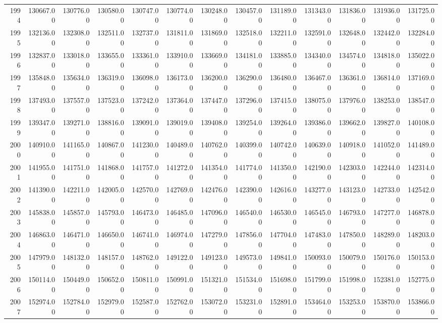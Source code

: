 \begin{longtable}{rrrrrrrrrrrrr}
  1994 & 130667.00 & 130776.00 & 130580.00 & 130747.00 & 130774.00 & 130248.00 & 130457.00 & 131189.00 & 131343.00 & 131836.00 & 131936.00 & 131725.00 \\ 
  1995 & 132136.00 & 132308.00 & 132511.00 & 132737.00 & 131811.00 & 131869.00 & 132518.00 & 132211.00 & 132591.00 & 132648.00 & 132442.00 & 132284.00 \\ 
  1996 & 132837.00 & 133018.00 & 133655.00 & 133361.00 & 133910.00 & 133669.00 & 134181.00 & 133885.00 & 134340.00 & 134574.00 & 134818.00 & 135022.00 \\ 
  1997 & 135848.00 & 135634.00 & 136319.00 & 136098.00 & 136173.00 & 136200.00 & 136290.00 & 136480.00 & 136467.00 & 136361.00 & 136814.00 & 137169.00 \\ 
  1998 & 137493.00 & 137557.00 & 137523.00 & 137242.00 & 137364.00 & 137447.00 & 137296.00 & 137415.00 & 138075.00 & 137976.00 & 138253.00 & 138547.00 \\ 
  1999 & 139347.00 & 139271.00 & 138816.00 & 139091.00 & 139019.00 & 139408.00 & 139254.00 & 139264.00 & 139386.00 & 139662.00 & 139827.00 & 140108.00 \\ 
  2000 & 140910.00 & 141165.00 & 140867.00 & 141230.00 & 140489.00 & 140762.00 & 140399.00 & 140742.00 & 140639.00 & 140918.00 & 141052.00 & 141489.00 \\ 
  2001 & 141955.00 & 141751.00 & 141868.00 & 141757.00 & 141272.00 & 141354.00 & 141774.00 & 141350.00 & 142190.00 & 142303.00 & 142244.00 & 142314.00 \\ 
  2002 & 141390.00 & 142211.00 & 142005.00 & 142570.00 & 142769.00 & 142476.00 & 142390.00 & 142616.00 & 143277.00 & 143123.00 & 142733.00 & 142542.00 \\ 
  2003 & 145838.00 & 145857.00 & 145793.00 & 146473.00 & 146485.00 & 147096.00 & 146540.00 & 146530.00 & 146545.00 & 146793.00 & 147277.00 & 146878.00 \\ 
  2004 & 146863.00 & 146471.00 & 146650.00 & 146741.00 & 146974.00 & 147279.00 & 147856.00 & 147704.00 & 147483.00 & 147850.00 & 148289.00 & 148203.00 \\ 
  2005 & 147979.00 & 148132.00 & 148157.00 & 148762.00 & 149122.00 & 149123.00 & 149573.00 & 149841.00 & 150093.00 & 150079.00 & 150176.00 & 150153.00 \\ 
  2006 & 150114.00 & 150449.00 & 150652.00 & 150811.00 & 150991.00 & 151321.00 & 151534.00 & 151698.00 & 151799.00 & 151998.00 & 152381.00 & 152775.00 \\ 
  2007 & 152974.00 & 152784.00 & 152979.00 & 152587.00 & 152762.00 & 153072.00 & 153231.00 & 152891.00 & 153464.00 & 153253.00 & 153870.00 & 153866.00 \\ 

\end{longtable}
